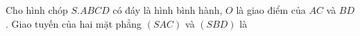 \begin{ex}
Cho hình chóp $S.ABCD$ có đáy là hình bình hành, $O$ là giao điểm của $AC$ và $BD$. Giao tuyến của hai mặt phẳng $(SAC)$ và $(SBD)$ là
\end{ex}

